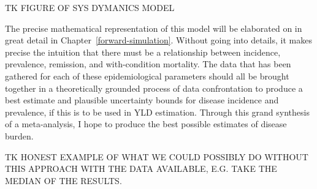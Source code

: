 TK FIGURE OF SYS DYMANICS MODEL

The precise mathematical representation of this model will be
elaborated on in great detail in
Chapter~\ref{forward-simulation}. Without going into details, it makes
precise the intuition that there must be a relationship between
incidence, prevalence, remission, and with-condition mortality. The
data that has been gathered for each of these epidemiological
parameters should all be brought together in a theoretically grounded
process of data confrontation to produce a best estimate and plausible
uncertainty bounds for disease incidence and prevalence, if this is to
be used in YLD estimation. Through this grand synthesis of a
meta-analysis, I hope to produce the best possible estimates of
disease burden.

TK HONEST EXAMPLE OF WHAT WE COULD POSSIBLY DO WITHOUT THIS APPROACH
WITH THE DATA AVAILABLE, E.G. TAKE THE MEDIAN OF THE RESULTS.


